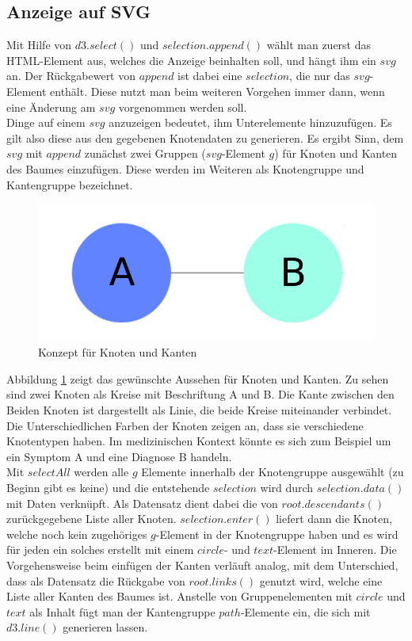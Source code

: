 \subsection{Anzeige auf SVG}
Mit Hilfe von $d3.select()$ und $selection.append()$ wählt man zuerst das HTML-Element aus, welches die Anzeige beinhalten soll, und hängt ihm ein $svg$ an. Der Rückgabewert von $append$ ist dabei eine $selection$, die nur das $svg$-Element enthält. Diese nutzt man beim weiteren Vorgehen immer dann, wenn eine Änderung am $svg$ vorgenommen werden soll.\\
Dinge auf einem $svg$ anzuzeigen bedeutet, ihm Unterelemente hinzuzufügen. Es gilt also diese aus den gegebenen Knotendaten zu generieren. Es ergibt Sinn, dem $svg$ mit $append$ zunächst zwei Gruppen ($svg$-Element $g$) für Knoten und Kanten des Baumes einzufügen. Diese werden im Weiteren als Knotengruppe und Kantengruppe bezeichnet. 
\begin{figure}
	\centering
	\includegraphics[width=\linewidth]{../screenshots/knotendesign.PNG}
	\caption{Konzept für Knoten und Kanten}
	\label{abb:design}
\end{figure} 
Abbildung \ref{abb:design} zeigt das gewünschte Aussehen für Knoten und Kanten. Zu sehen sind zwei Knoten als Kreise mit Beschriftung A und B. Die Kante zwischen den Beiden Knoten ist dargestellt als Linie, die beide Kreise miteinander verbindet. Die Unterschiedlichen Farben der Knoten zeigen an, dass sie verschiedene Knotentypen haben. Im medizinischen Kontext könnte es sich zum Beispiel um ein Symptom A und eine Diagnose B handeln.\\
Mit $selectAll$ werden alle $g$ Elemente innerhalb der Knotengruppe ausgewählt (zu Beginn gibt es keine) und die entstehende $selection$ wird durch $selection.data()$ mit Daten verknüpft. Als Datensatz dient dabei die von $root.descendants()$ zurückgegebene Liste aller Knoten. $selection.enter()$ liefert dann die Knoten, welche noch kein zugehöriges $g$-Element in der Knotengruppe haben und es wird für jeden ein solches erstellt mit einem $circle$- und $text$-Element im Inneren. Die Vorgehensweise beim einfügen der Kanten verläuft analog, mit dem Unterschied, dass als Datensatz die Rückgabe von $root.links()$ genutzt wird, welche eine Liste aller Kanten des Baumes ist. Anstelle von Gruppenelementen mit $circle$ und $text$ als Inhalt fügt man der Kantengruppe $path$-Elemente ein, die sich mit $d3.line()$ generieren lassen.\\
